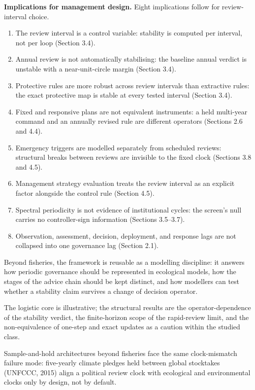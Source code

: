 \documentclass[11pt]{article}
\providecommand{\tightlist}{\setlength{\itemsep}{0pt}\setlength{\parskip}{0pt}}
\begin{document}
\textbf{Implications for management design.} Eight implications follow for review-interval choice. \begin{enumerate} \def\labelenumi{(\arabic{enumi})} \tightlist \item The review interval is a control variable: stability is computed per interval, not per loop (Section 3.4). \item Annual review is not automatically stabilising: the baseline annual verdict is unstable with a near-unit-circle margin (Section 3.4). \item Protective rules are more robust across review intervals than extractive rules: the exact protective map is stable at every tested interval (Section 3.4). \item Fixed and responsive plans are not equivalent instruments: a held multi-year command and an annually revised rule are different operators (Sections 2.6 and 4.4). \item Emergency triggers are modelled separately from scheduled reviews: structural breaks between reviews are invisible to the fixed clock (Sections 3.8 and 4.5). \item Management strategy evaluation treats the review interval as an explicit factor alongside the control rule (Section 4.5). \item Spectral periodicity is not evidence of institutional cycles: the screen's null carries no controller-sign information (Sections 3.5--3.7). \item Observation, assessment, decision, deployment, and response lags are not collapsed into one governance lag (Section 2.1). \end{enumerate}

Beyond fisheries, the framework is reusable as a modelling discipline: it answers how periodic governance should be represented in ecological models, how the stages of the advice chain should be kept distinct, and how modellers can test whether a stability claim survives a change of decision operator.

The logistic core is illustrative; the structural results are the operator-dependence of the stability verdict, the finite-horizon scope of the rapid-review limit, and the non-equivalence of one-step and exact updates as a caution within the studied class.

Sample-and-hold architectures beyond fisheries face the same clock-mismatch failure mode: five-yearly climate pledges held between global stocktakes (UNFCCC, 2015) align a political review clock with ecological and environmental clocks only by design, not by default.
\end{document}
